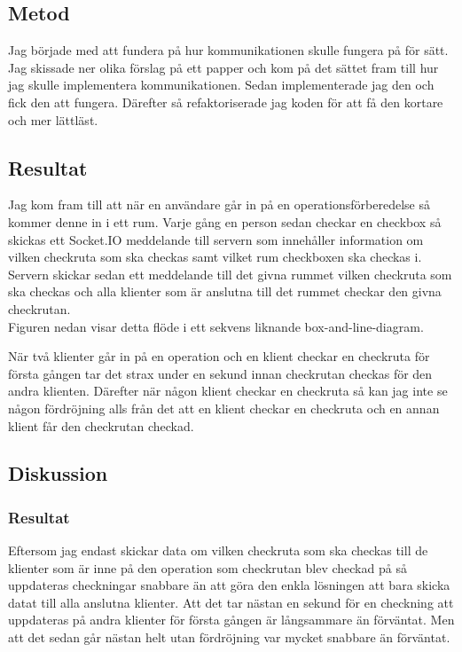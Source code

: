  
\subsection{Metod}
Jag började med att fundera på hur kommunikationen skulle fungera på för sätt. Jag skissade ner olika förslag på ett papper och kom på det sättet fram till hur jag skulle implementera kommunikationen. Sedan implementerade jag den och fick den att fungera. Därefter så refaktoriserade jag koden för att få den kortare och mer lättläst.

\subsection{Resultat}
Jag kom fram till att när en användare går in på en operationsförberedelse så kommer denne in i ett rum. Varje gång en person sedan checkar en checkbox så skickas ett Socket.IO meddelande till servern som innehåller information om vilken checkruta som ska checkas samt vilket rum checkboxen ska checkas i. Servern skickar sedan ett meddelande till det givna rummet vilken checkruta som ska checkas och alla klienter som är anslutna till det rummet checkar den givna checkrutan. \\

Figuren nedan visar detta flöde i ett sekvens liknande box-and-line-diagram.

När två klienter går in på en operation och en klient checkar en checkruta för första gången tar det strax under en sekund innan checkrutan checkas för den andra klienten. Därefter när någon klient checkar en checkruta så kan jag inte se någon fördröjning alls från det att en klient checkar en checkruta och en annan klient får den checkrutan checkad.

\subsection{Diskussion}
\subsubsection{Resultat}
Eftersom jag endast skickar data om vilken checkruta som ska checkas till de klienter som är inne på den operation som checkrutan blev checkad på så uppdateras checkningar snabbare än att göra den enkla lösningen att bara skicka datat till alla anslutna klienter. Att det tar nästan en sekund för en checkning att uppdateras på andra klienter för första gången är långsammare än förväntat. Men att det sedan går nästan helt utan fördröjning var mycket snabbare än förväntat. 

